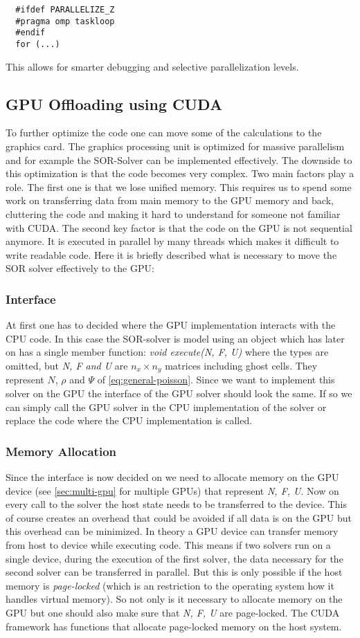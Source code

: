 \documentclass[master.tex]{subfiles}
\begin{document}
\begin{lstlisting}
  #ifdef PARALLELIZE_Z
  #pragma omp taskloop
  #endif
  for (...)
\end{lstlisting}
This allows for smarter debugging and selective parallelization levels.

\subsection{GPU Offloading using CUDA}
To further optimize the code one can move some of the calculations to the graphics card. The graphics processing unit is optimized for massive parallelism and for example the SOR-Solver can be implemented effectively. The downside to this optimization is that the code becomes very complex. Two main factors play a role. The first one is that we lose unified memory. This requires us to spend some work on transferring data from main memory to the GPU memory and back, cluttering the code and making it hard to understand for someone not familiar with CUDA. The second key factor is that the code on the GPU is not sequential anymore. It is executed in parallel by many threads which makes it difficult to write readable code.\newline
Here it is briefly described what is necessary to move the SOR solver effectively to the GPU:
\subsubsection{Interface}
At first one has to decided where the GPU implementation interacts with the CPU code. In this case the \ac{SOR}-solver is model using an object which has later on has a single member function: \textit{void execute(N, F, U)} where the types are omitted, but \textit{N, F and U} are $n_x \times n_y$ matrices including ghost cells. They represent $N$, $\rho$ and $\Psi$ of \autoref{eq:general-poisson}. Since we want to implement this solver on the GPU the interface of the GPU solver should look the same. If so we can simply call the GPU solver in the CPU implementation of the solver or replace the code where the CPU implementation is called.
\subsubsection{Memory Allocation}
Since the interface is now decided on we need to allocate memory on the GPU device (see \autoref{sec:multi-gpu} for multiple GPUs) that represent \textit{N, F, U}. Now on every call to the solver the host state needs to be transferred to the device. This of course creates an overhead that could be avoided if all data is on the GPU but this overhead can be minimized. In theory a GPU device can transfer memory from host to device while executing code. This means if two solvers run on a single device, during the execution of the first solver, the data necessary for the second solver can be transferred in parallel. But this is only possible if the host memory is \textit{page-locked} (which is an restriction to the operating system how it handles virtual memory). So not only is it necessary to allocate memory on the GPU but one should also make sure that \textit{N, F, U} are page-locked. The CUDA framework has functions that allocate page-locked memory on the host system.
\end{document}
